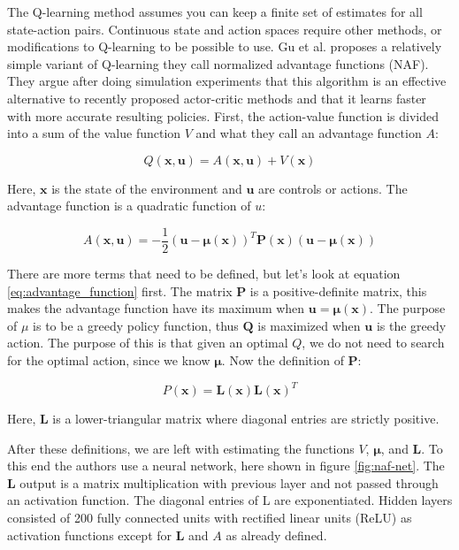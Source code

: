 The Q-learning method assumes you can keep a finite set of estimates for all
state-action pairs. Continuous state and action spaces require other methods,
or modifications to Q-learning to be possible to use. Gu et al.
\cite{gu2016continuous} proposes a relatively simple variant of Q-learning they
call normalized advantage functions (NAF). They argue after doing simulation
experiments that this algorithm is an effective alternative to recently
proposed actor-critic methods and that it learns faster with more accurate
resulting policies. First, the action-value function is divided into a sum of
the value function $V$ and what they call an advantage function $A$:

\begin{equation}
    Q(\mathbf{x}, \mathbf{u}) = A(\mathbf{x}, \mathbf{u}) + V(\mathbf{x})
\end{equation}

Here, $\mathbf{x}$ is the state of the environment and $\mathbf{u}$ are
controls or actions. The advantage function is a quadratic function of $u$:

\begin{equation}
    A(\mathbf{x}, \mathbf{u}) = -\frac{1}{2}(\mathbf{u} - \mathbf{\mu(x)})^T\mathbf{P(x)}(\mathbf{u} - \mathbf{\mu(x)})
    \label{eq:advantage_function}
\end{equation}

There are more terms that need to be defined, but let's look at equation
\ref{eq:advantage_function} first. The matrix $\mathbf{P}$ is a
positive-definite matrix, this makes the advantage function have its maximum
when $\mathbf{u = \mu(x)}$.  The purpose of $\mu$ is to be a greedy policy
function, thus $\mathbf{Q}$ is maximized when $\mathbf{u}$ is the greedy
action. The purpose of this is that given an optimal $Q$, we do not need to
search for the optimal action, since we know $\mathbf{\mu}$. Now the definition
of $\mathbf{P}$:

\begin{equation}
    P(\mathbf{x}) = \mathbf{L(x)L(x)}^T
\end{equation}

Here, $\mathbf{L}$ is a lower-triangular matrix where diagonal entries are
strictly positive.

After these definitions, we are left with estimating the functions $V$,
$\mathbf{\mu}$, and $\mathbf{L}$. To this end the authors use a neural network,
here shown in figure \ref{fig:naf-net}. The $\mathbf{L}$ output is a matrix
multiplication with previous layer and not passed through an activation
function. The diagonal entries of L are exponentiated. Hidden layers consisted
of 200 fully connected units with rectified linear units (ReLU) as activation
functions except for $\mathbf{L}$ and $A$ as already defined.

